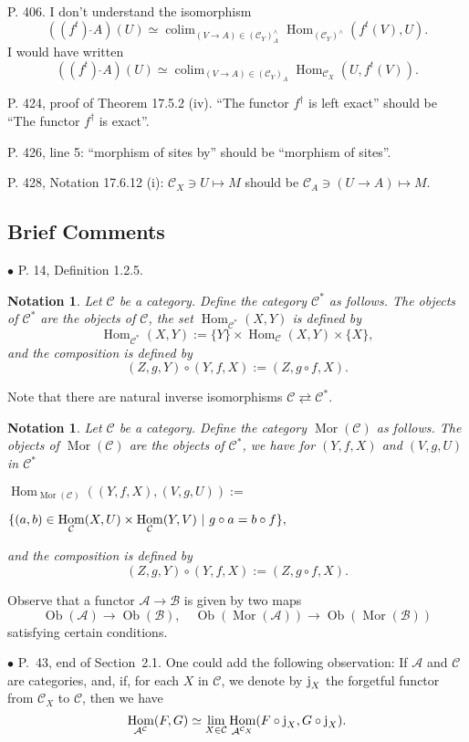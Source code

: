 \documentclass[12pt]{article}
\newtheorem{nota}[thm]{Notation}
\theoremstyle{remark}%
\newcommand{\bu}{\bullet}
\newcommand{\n}{\noindent}
\newcommand{\A}{\mathcal A}
\newcommand{\B}{\mathcal B}
\newcommand{\C}{\mathcal C}
\newcommand{\be}{\begin{equation}}
\newcommand{\ee}{\end{equation}}
\DeclareMathOperator*{\co}{colim}
\DeclareMathOperator{\h}{Hom}
\DeclareMathOperator{\Mor}{Mor}
\DeclareMathOperator{\Ob}{Ob}
\begin{document}
\n P. 406. I don't understand the isomorphism 
\be\label{406}
\left((f^t)\ \widehat{}A\right)(U)\simeq\co_{(V\to A)\in(\C_Y)_A^\wedge}\h_{(\C_Y)^\wedge}(f^t(V),U).
\ee 
I would have written 
$$
\left((f^t)\ \widehat{}A\right)(U)\simeq\co_{(V\to A)\in(\C_Y)_A}\h_{\C_X}(U,f^t(V)).
$$

\n P. 424, proof of Theorem 17.5.2 (iv). ``The functor $f^\dagger$ is left exact'' should be ``The functor $f^\dagger$ is exact''.

\n P. 426, line 5: ``morphism of sites by'' should be ``morphism of sites''.

\n P. 428, Notation 17.6.12 (i): $\C_X\ni U\mapsto M$ should be $\C_A\ni(U\to A)\mapsto M$.
%
\subsection{Brief Comments} %
%
\n$\bu$ P. 14, Definition 1.2.5.
%
\begin{nota}\label{c*}
%
Let $\C$ be a category. Define the category $\C^*$ as follows. The objects of $\C^*$ are the objects of $\C$, the set $\h_{\C^*}(X,Y)$ is defined by  
$$
\h_{\C^*}(X,Y):=\{Y\}\times\h_{\C}(X,Y)\times\{X\},
$$
and the composition is defined by 
$$
(Z,g,Y)\circ(Y,f,X):=(Z,g\circ f,X).
$$ 
%
\end{nota}
%
Note that there are natural inverse isomorphisms $\C\rightleftarrows\C^*$. 
%
\begin{nota}\label{mor}
%
Let $\C$ be a category. Define the category $\Mor(\C)$ as follows. The objects of $\Mor(\C)$ are the objects of $\C^*$, we have for $(Y,f,X)$ and $(V,g,U)$ in $\C^*$\bigskip 

\n$\displaystyle \h_{\Mor(\C)}((Y,f,X),(V,g,U)):=$\bigskip 

$\hfill\displaystyle\{(a,b)\in\h_\C(X,U)\times\h_\C(Y,V)\ | \ g\circ a=b\circ f\},$\bigskip 

\n and the composition is defined by 
$$
(Z,g,Y)\circ(Y,f,X):=(Z,g\circ f,X).
$$
%
\end{nota}
%
Observe that a functor $\A\to\B$ is given by two maps 
$$
\Ob(\A)\to\Ob(\B),\quad\Ob(\Mor(\A))\to\Ob(\Mor(\B))
$$ 
satisfying certain conditions. 


\n$\bu$ P.~43, end of Section~2.1. One could add the following observation: If $\A$ and $\C$ are categories, and, if, for each $X$ in $\C$, we denote by $\text j_X$ the forgetful functor from $\C_X$ to $\C$, then we have 
\be\label{17115}
\h_{\A^\C}(F,G)\simeq\lim_{X\in\C}\h_{\A^{\C_X}}(F\circ\text j_X,G\circ\text j_X).
\ee
\end{document}
